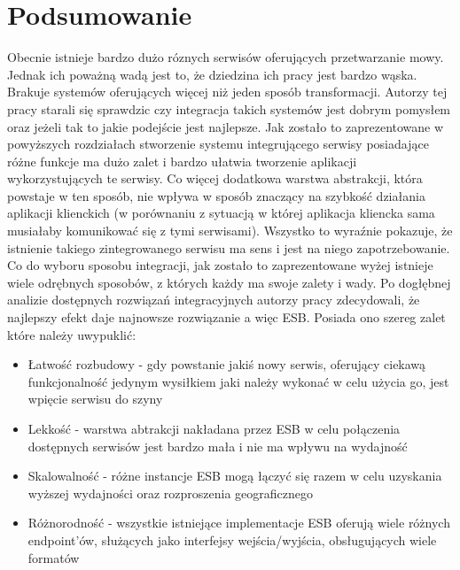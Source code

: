 
\chapter{Podsumowanie} %



\ifpdf
    \graphicspath{{7/figures/PNG/}{7/figures/PDF/}{7/figures/}}
\else
    \graphicspath{{7/figures/EPS/}{7/figures/}}
\fi

Obecnie istnieje bardzo dużo róznych serwisów oferujących przetwarzanie mowy. Jednak ich poważną wadą jest to, że dziedzina ich pracy jest bardzo wąska. Brakuje systemów oferujących więcej niż jeden sposób transformacji. Autorzy tej pracy starali się sprawdzic czy integracja takich systemów jest dobrym pomysłem oraz jeżeli tak to jakie podejście jest najlepsze. Jak zostało to zaprezentowane w powyższych rozdziałach stworzenie systemu integrującego serwisy posiadające różne funkcje ma dużo zalet i bardzo ułatwia tworzenie aplikacji wykorzystujących te serwisy. Co więcej dodatkowa warstwa abstrakcji, która powstaje w ten sposób, nie wpływa w sposób znaczący na szybkość działania aplikacji klienckich (w porównaniu z sytuacją w której aplikacja kliencka sama musiałaby komunikować się z tymi serwisami). Wszystko to wyraźnie pokazuje, że istnienie takiego zintegrowanego serwisu ma sens i jest na niego zapotrzebowanie. \\
Co do wyboru sposobu integracji, jak zostało to zaprezentowane wyżej istnieje wiele odrębnych sposobów, z których każdy ma swoje zalety i wady. Po dogłębnej analizie dostępnych rozwiązań integracyjnych autorzy pracy zdecydowali, że najlepszy efekt daje najnowsze rozwiązanie a więc ESB. Posiada ono szereg zalet które należy uwypuklić:
\begin{itemize}
	\item Łatwość rozbudowy - gdy powstanie jakiś nowy serwis, oferujący ciekawą funkcjonalność jedynym wysiłkiem jaki należy wykonać w celu użycia go, jest wpięcie serwisu do szyny
	\item Lekkość - warstwa abtrakcji nakładana przez ESB w celu połączenia dostępnych serwisów jest bardzo mała i nie ma wpływu na wydajność
	\item Skalowalność - różne instancje ESB mogą łączyć się razem w celu uzyskania wyższej wydajności oraz rozproszenia geograficznego
	\item Różnorodność - wszystkie istniejące implementacje ESB oferują wiele różnych endpoint'ów, służących jako interfejsy wejścia/wyjścia, obsługujących wiele formatów
\end{itemize}
